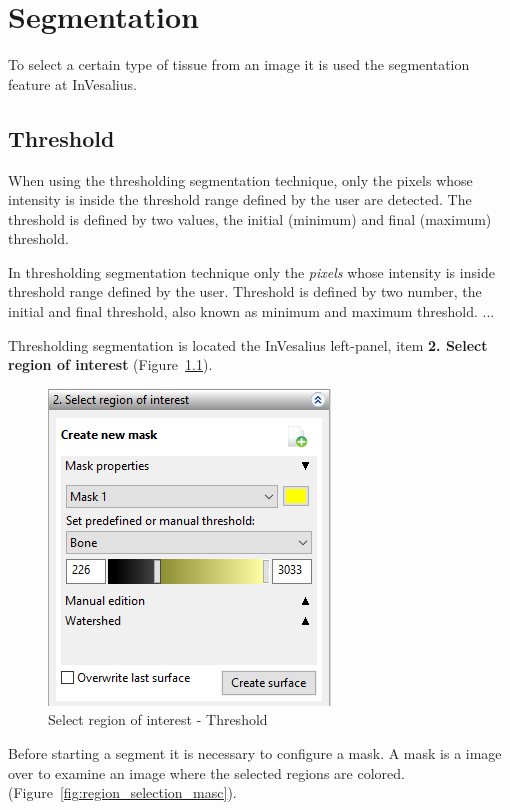 \chapter{Segmentation}

To select a certain type of tissue from an image it is used the segmentation feature at InVesalius.

\section{Threshold}

When using the thresholding segmentation technique, only the pixels whose intensity is inside the threshold range defined by the user are detected. The threshold is defined by two values, the initial (minimum) and final (maximum) threshold.

In thresholding segmentation technique only the \textit{pixels} whose intensity is inside threshold range defined by the user. Threshold is defined by two number, the initial and final threshold, also known as minimum and maximum threshold. ...

Thresholding segmentation is located the InVesalius left-panel, item \textbf{2. Select region of interest} (Figure~\ref{fig:region_selection}).

\begin{figure}[!htb]
\centering
\includegraphics[scale=0.7]{../user_guide_figures/invesalius_screen/segmentation_threshold_window_left_en.png}
\caption{Select region of interest - Threshold}
\label{fig:region_selection}
\end{figure}

Before starting a segment it is necessary to configure a mask. A mask is a image over to examine an image where the selected regions are colored. (Figure~\ref{fig:region_selection_masc}).

